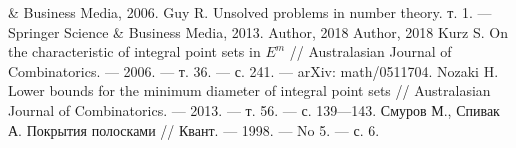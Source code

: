 \begin{thebibliography}{99}
\& Business Media, 2006.
Guy R. Unsolved problems in number theory. т. 1. — Springer Science \& Business Media,
2013.
Author, 2018
Author, 2018
Kurz S. On the characteristic of integral point sets in $E^m$ // Australasian Journal of
Combinatorics. — 2006. — т. 36. — с. 241. — arXiv: math/0511704.
Nozaki H. Lower bounds for the minimum diameter of integral point sets // Australasian
Journal of Combinatorics. — 2013. — т. 56. — с. 139—143.
Смуров М., Спивак А. Покрытия полосками // Квант. — 1998. — No 5. — с. 6.
\end{thebibliography}
